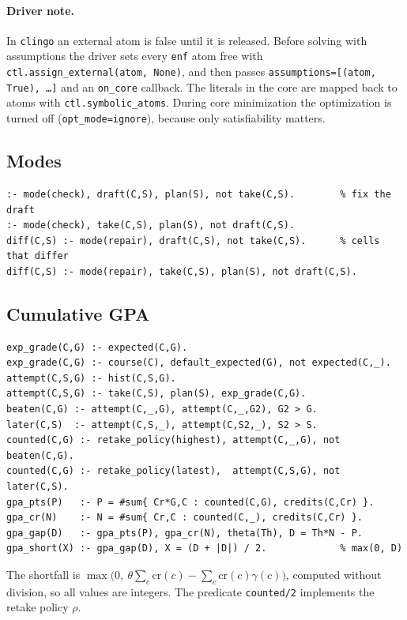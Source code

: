 \documentclass[10pt,a4paper]{article}
\begin{document}
\paragraph{Driver note.}
In \texttt{clingo} an external atom is false until it is released. Before
solving with assumptions the driver sets every \texttt{enf} atom free with
\texttt{ctl.assign\_external(atom, None)}, and then passes
\texttt{assumptions=[(atom, True), \dots]} and an \texttt{on\_core} callback.
The literals in the core are mapped back to atoms with
\texttt{ctl.symbolic\_atoms}. During core minimization the optimization
is turned off (\texttt{opt\_mode=ignore}), because only satisfiability matters.
 
\subsection{Modes}
 
\begin{lstlisting}
:- mode(check), draft(C,S), plan(S), not take(C,S).        % fix the draft
:- mode(check), take(C,S), plan(S), not draft(C,S).
diff(C,S) :- mode(repair), draft(C,S), not take(C,S).      % cells that differ
diff(C,S) :- mode(repair), take(C,S), plan(S), not draft(C,S).
\end{lstlisting}
 
\subsection{Cumulative GPA}
 
\begin{lstlisting}
exp_grade(C,G) :- expected(C,G).
exp_grade(C,G) :- course(C), default_expected(G), not expected(C,_).
attempt(C,S,G) :- hist(C,S,G).
attempt(C,S,G) :- take(C,S), plan(S), exp_grade(C,G).
beaten(C,G) :- attempt(C,_,G), attempt(C,_,G2), G2 > G.
later(C,S)  :- attempt(C,S,_), attempt(C,S2,_), S2 > S.
counted(C,G) :- retake_policy(highest), attempt(C,_,G), not beaten(C,G).
counted(C,G) :- retake_policy(latest),  attempt(C,S,G), not later(C,S).
gpa_pts(P)   :- P = #sum{ Cr*G,C : counted(C,G), credits(C,Cr) }.
gpa_cr(N)    :- N = #sum{ Cr,C : counted(C,_), credits(C,Cr) }.
gpa_gap(D)   :- gpa_pts(P), gpa_cr(N), theta(Th), D = Th*N - P.
gpa_short(X) :- gpa_gap(D), X = (D + |D|) / 2.             % max(0, D)
\end{lstlisting}
The shortfall is $\max\bigl(0,\ \theta\sum_c \mathrm{cr}(c)-\sum_c \mathrm{cr}(c)\gamma(c)\bigr)$,
computed without division, so all values are integers. The predicate
\texttt{counted/2} implements the retake policy $\rho$.
 
\end{document}
